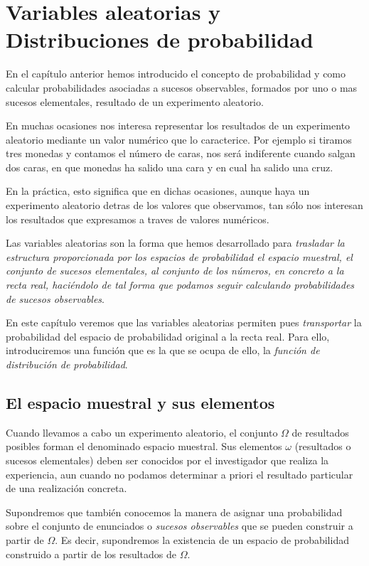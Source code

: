 \documentclass[
]{article}
\begin{document}
\section{Variables aleatorias y Distribuciones de probabilidad}\label{variables-aleatorias-y-distribuciones-de-probabilidad}

En el capítulo anterior hemos introducido el concepto de probabilidad y
como calcular probabilidades asociadas a sucesos observables, formados
por uno o mas sucesos elementales, resultado de un experimento
aleatorio.

En muchas ocasiones nos interesa representar los resultados de un
experimento aleatorio mediante un valor numérico que lo caracterice. Por
ejemplo si tiramos tres monedas y contamos el número de caras, nos será
indiferente cuando salgan dos caras, en que monedas ha salido una cara y
en cual ha salido una cruz.

En la práctica, esto significa que en dichas ocasiones, aunque haya un
experimento aleatorio detras de los valores que observamos, tan sólo nos
interesan los resultados que expresamos a traves de valores numéricos.

Las variables aleatorias son la forma que hemos desarrollado para
\emph{trasladar la estructura proporcionada por los espacios de probabilidad
el espacio muestral, el conjunto de sucesos elementales, al conjunto de
los números, en concreto a la recta real, haciéndolo de tal forma que
podamos seguir calculando probabilidades de sucesos observables}.

En este capítulo veremos que las variables aleatorias permiten pues
\emph{transportar} la probabilidad del espacio de probabilidad original a la
recta real. Para ello, introduciremos una función que es la que se ocupa
de ello, la \emph{función de distribución de probabilidad}.

\subsection{El espacio muestral y sus elementos}\label{el-espacio-muestral-y-sus-elementos}

Cuando llevamos a cabo un experimento aleatorio, el conjunto \(\Omega\) de
resultados posibles forman el denominado espacio muestral. Sus elementos
\(\omega\) (resultados o sucesos elementales) deben ser conocidos por el
investigador que realiza la experiencia, aun cuando no podamos
determinar a priori el resultado particular de una realización concreta.

Supondremos que también conocemos la manera de asignar una probabilidad
sobre el conjunto de enunciados o \emph{sucesos observables} que se pueden
construir a partir de \(\Omega\). Es decir, supondremos la existencia de
un espacio de probabilidad construido a partir de los resultados de
\(\Omega\).
\end{document}
